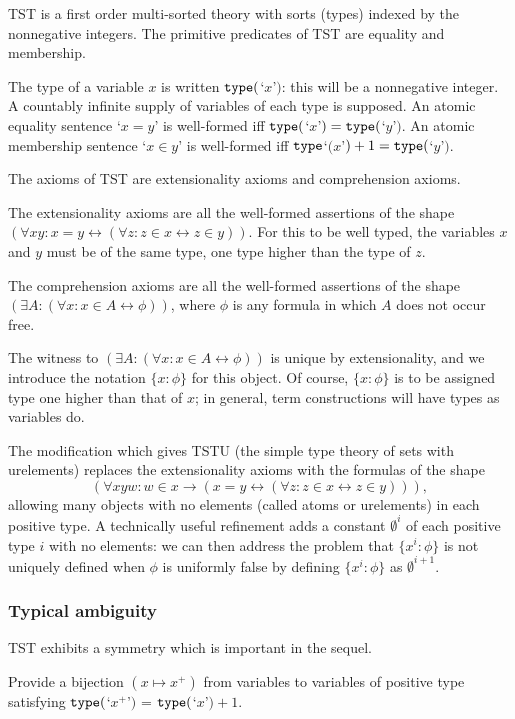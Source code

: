 \documentclass[12pt]{article}
\begin{document}
TST is a first order multi-sorted theory with sorts (types) indexed by the nonnegative integers.  The primitive predicates of TST are equality and membership.

The type of a variable $x$ is written ${\tt type}($`$x$'$)$:  this will be a nonnegative integer.   A countably infinite supply of variables of each type is supposed.  An atomic equality sentence `$x=y$' is well-formed iff ${\tt type}($`$x$'$)={\tt type}($`$y$'$)$.
An atomic membership sentence `$x \in y$' is well-formed iff ${\tt type}$`$(x$'$)+1 = {\tt type}($`$y$'$)$.

The axioms of TST are extensionality axioms and comprehension axioms.

The extensionality axioms are all the well-formed assertions of the shape $(\forall xy:x=y \leftrightarrow (\forall z:z \in x \leftrightarrow z\in y))$.  For this to be well typed, the variables
$x$ and $y$ must be of the same type, one type higher than the type of $z$.

The comprehension axioms are all the well-formed assertions of the shape $(\exists A:(\forall x:x \in A \leftrightarrow \phi))$, where $\phi$ is any formula in which $A$ does not occur free.

The witness to $(\exists A:(\forall x:x \in A \leftrightarrow \phi))$ is unique by extensionality, and we introduce the notation $\{x:\phi\}$ for this object.  Of course, $\{x:\phi\}$  is to be assigned type one higher than that of $x$;  in general, term constructions will have types as variables do.

The modification which gives TSTU (the simple type theory of sets with urelements) replaces the extensionality axioms with the formulas of the shape $$(\forall xyw:w \in x \rightarrow (x=y \leftrightarrow (\forall z:z \in x \leftrightarrow z\in y))),$$  allowing many objects with no elements (called atoms or urelements)  in each positive type.  A technically useful refinement adds a constant $\emptyset^i$ of each positive type $i$ with no elements:  we can then address the problem that $\{x^i:\phi\}$ is not uniquely defined when $\phi$ is uniformly false by defining $\{x^i:\phi\}$ as $\emptyset^{i+1}$.

\subsubsection{Typical ambiguity}

TST exhibits a symmetry which is important in the sequel.

Provide a bijection $(x \mapsto x^+)$ from variables to variables of positive type satisfying   ${\tt type}($`$x^+$'$)$ = ${\tt type}($`$x$'$)+1$.
\end{document}
